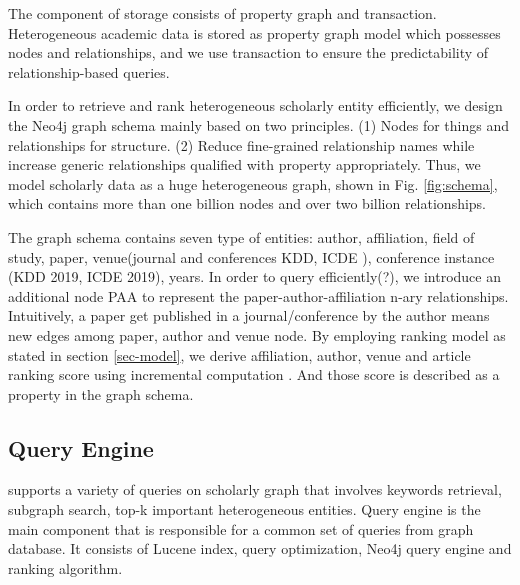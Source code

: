 \par
The component of storage consists of property graph and transaction. Heterogeneous academic data is stored as property graph model which possesses nodes and relationships, and we use transaction to ensure the predictability of relationship-based queries.

\par
In order to retrieve and rank heterogeneous scholarly entity efficiently, we design the Neo4j graph schema mainly based on two principles. (1) Nodes for things and relationships for structure. (2) Reduce fine-grained relationship names while increase generic relationships qualified with property appropriately. Thus, we model scholarly data as a huge heterogeneous graph, shown in Fig. \ref{fig:schema}, which contains more than one billion nodes and over two billion relationships.

\par
The graph schema contains seven type of entities: author, affiliation, field of study, paper, venue(journal and conferences \eg KDD, ICDE ), conference instance (\eg KDD 2019, ICDE 2019), years. In order to query efficiently(?), we introduce an additional node PAA to represent the paper-author-affiliation n-ary relationships. Intuitively, a paper get published in a journal/conference by the author means new edges among paper, author and venue node. By employing ranking model as stated in section \ref{sec-model}, we derive affiliation, author, venue and article ranking score using incremental computation \cite{ma2018query}. And those score is described as a property in the graph schema.



\subsection{Query Engine}
\oursystem supports a variety of queries on scholarly graph that involves keywords retrieval, subgraph search, top-k important heterogeneous entities. Query engine is the main component that is responsible for a common set of queries from graph database. It consists of Lucene index, query optimization, Neo4j query engine and ranking algorithm.

